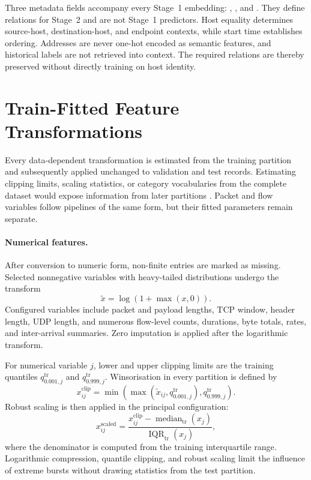\documentclass[11pt,fleqn]{report}
\begin{document}
Three metadata fields accompany every Stage~1 embedding: , , and . They define relations for Stage~2 and are not Stage~1 predictors. Host equality determines source-host, destination-host, and endpoint contexts, while start time establishes ordering. Addresses are never one-hot encoded as semantic features, and historical labels are not retrieved into context. The required relations are thereby preserved without directly training on host identity.

\section{Train-Fitted Feature Transformations}
\label{subsec:feature_transformations}

Every data-dependent transformation is estimated from the training partition and subsequently applied unchanged to validation and test records. Estimating clipping limits, scaling statistics, or category vocabularies from the complete dataset would expose information from later partitions \cite{Arp2022DosDonts}. Packet and flow variables follow pipelines of the same form, but their fitted parameters remain separate.

\paragraph{Numerical features.}
After conversion to numeric form, non-finite entries are marked as missing. Selected nonnegative variables with heavy-tailed distributions undergo the transform
\begin{equation}
    \widetilde{x}=\log(1+\max(x,0)).
    \label{eq:log1p_preprocessing}
\end{equation}
Configured variables include packet and payload lengths, TCP window, header length, UDP length, and numerous flow-level counts, durations, byte totals, rates, and inter-arrival summaries. Zero imputation is applied after the logarithmic transform.

For numerical variable $j$, lower and upper clipping limits are the training quantiles $q_{0.001,j}^{\mathrm{tr}}$ and $q_{0.999,j}^{\mathrm{tr}}$. Winsorisation in every partition is defined by
\begin{equation}
    x_{ij}^{\mathrm{clip}}
    = \min\!\left(
        \max\!\left(\widetilde{x}_{ij},q_{0.001,j}^{\mathrm{tr}}\right),
        q_{0.999,j}^{\mathrm{tr}}
      \right).
    \label{eq:quantile_clipping}
\end{equation}
Robust scaling is then applied in the principal configuration:
\begin{equation}
    x_{ij}^{\mathrm{scaled}}
    = \frac{x_{ij}^{\mathrm{clip}}-
             \operatorname{median}_{\mathrm{tr}}(x_j)}
            {\operatorname{IQR}_{\mathrm{tr}}(x_j)},
    \label{eq:robust_scaling}
\end{equation}
where the denominator is computed from the training interquartile range. Logarithmic compression, quantile clipping, and robust scaling limit the influence of extreme bursts without drawing statistics from the test partition.
\end{document}
